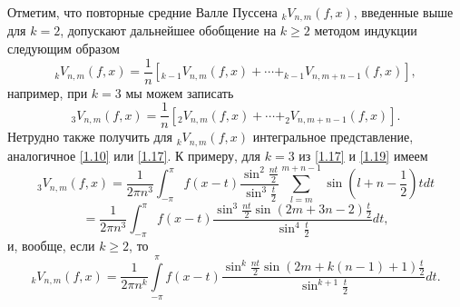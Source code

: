  Отметим, что повторные средние Валле Пуссена $_kV_{n,m}(f,x)$, введенные выше для $k=2$, допускают дальнейшее обобщение на $k\ge2$    методом индукции следующим образом
\begin{equation}\label{1.18}
  {}_{k}V_{n,m}(f,x)=\frac1{n}[ _{k-1}V_{n,m}(f,x)+\cdots+ _{k-1}V_{n,m+n-1}(f,x)],
\end{equation}
например, при $k=3$ мы можем записать
\begin{equation}\label{1.19}
  _3V_{n,m}(f,x)=\frac1{n}[ _2V_{n,m}(f,x)+\cdots+ _2V_{n,m+n-1}(f,x)].
\end{equation}
Нетрудно также получить для $_kV_{n,m}(f,x)$ интегральное представление, аналогичное \eqref{1.10} или \eqref{1.17}. К примеру, для $k=3$ из \eqref{1.17} и \eqref{1.19} имеем
$$
 _3V_{n,m}(f,x)=\frac{1}{2\pi n^3}\int_{-\pi}^\pi f(x-t) \frac{\sin^2\frac{nt}{2}}{\sin^3\frac{t}{2}}\sum_{l=m}^{m+n-1}\sin(l+n-\frac12)tdt
$$
  \begin{equation}\label{1.20}
= \frac{1}{2\pi n^3}\int_{-\pi}^\pi f(x-t) \frac{\sin^3\frac{nt}{2}\sin(2m+3n-2)\frac{t}{2}}{\sin^4\frac{t}{2}}dt,
  \end{equation}
и, вообще, если $k\ge2$, то
 \begin{equation}\label{1.21}
_kV_{n,m}(f,x)= \frac{1}{2\pi n^k}\int\limits_{-\pi}^\pi f(x-t) \frac{\sin^k\frac{nt}{2}\sin(2m+k(n-1)+1)\frac{t}{2}}{\sin^{k+1}\frac{t}{2}}dt.
  \end{equation}






